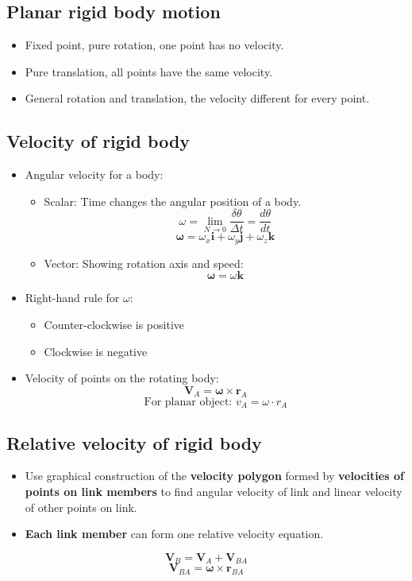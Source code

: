 \documentclass[11pt]{article}
\begin{document}
\subsection{Planar rigid body motion}
\label{sec:org6583246}
\begin{itemize}
\item Fixed point, pure rotation, one point has no velocity.
\item Pure translation, all points have the same velocity.
\item General rotation and translation, the velocity different for every point.
\end{itemize}
\subsection{Velocity of rigid body}
\label{sec:org2629d29}
\begin{itemize}
\item Angular velocity for a body:
\begin{itemize}
\item Scalar: Time changes the angular position of a body.
\[\omega = \lim_{N \rightarrow 0} \frac{\delta \theta}{\Delta t} = \frac{d \theta}{dt}\]
\[\boldsymbol{\omega} = \omega_x \boldsymbol{i} + \omega_y \boldsymbol{j} + \omega_z \boldsymbol{k}\]
\item Vector: Showing rotation axis and speed:
\[\boldsymbol{\omega} = \omega \boldsymbol{k}\]
\end{itemize}
\item Right-hand rule for \(\omega\):
\begin{itemize}
\item Counter-clockwise is positive
\item Clockwise is negative
\end{itemize}
\item Velocity of points on the rotating body:
\[\boldsymbol{V}_A = \boldsymbol{\omega} \times \boldsymbol{r}_A\]
\[\text{For planar object: } v_A = \omega \cdot r_A\]
\end{itemize}

 \newpage
\subsection{Relative velocity of rigid body}
\label{sec:orgdce79c4}
\begin{itemize}
\item Use graphical construction of the \textbf{velocity polygon} formed by \textbf{velocities of points on link members} to find angular velocity of link and linear velocity of other points on link.
\item \textbf{Each link member} can form one relative velocity equation.
\end{itemize}
\[\boldsymbol{V}_B = \boldsymbol{V}_A + \boldsymbol{V}_{BA}\]
\[\boldsymbol{V}_{BA} = \boldsymbol{\omega} \times \boldsymbol{r}_{BA}\]
\end{document}
